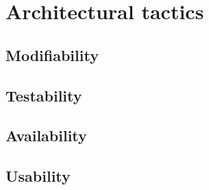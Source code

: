 \section{Architectural tactics}
\label{sec:architecturaltactics}


\subsection{Modifiability} %

\subsection{Testability} %

\subsection{Availability} %

\subsection{Usability} %